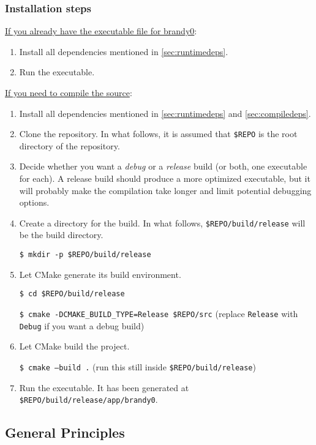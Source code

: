 \documentclass{article}
\newcommand{\icd}[1]{\texttt{#1}}
\newcommand{\ccd}[1]{\colorbox{gray!15!white}{\texttt{#1}}}
\newcommand{\scd}[1]{
	\vspace*{5pt}

	\ccd{#1}
	\vspace*{5pt}
}
\newcommand{\nscd}[1]{\scd{\$ #1}}
\newcommand{\pname}{brandy0}
\begin{document}
\subsubsection{Installation steps}
\underline{If you already have the executable file for \pname{}}:
\begin{enumerate}
	\item
		Install all dependencies mentioned in \ref{sec:runtimedeps}.
	\item
		Run the executable.
\end{enumerate}
\underline{If you need to compile the source}:
\begin{enumerate}
	\item
		Install all dependencies mentioned in \ref{sec:runtimedeps} and \ref{sec:compiledeps}.
	\item
		Clone the repository. In what follows, it is assumed that \icd{\$REPO} is the root directory of the repository.
	\item
		Decide whether you want a \emph{debug} or a \emph{release} build (or both, one executable for each). A release build should produce a more optimized executable, but it will probably make the compilation take longer and limit potential debugging options.
	\item
		Create a directory for the build. In what follows, \icd{\$REPO/build/release} will be the build directory.
		\nscd{mkdir -p \$REPO/build/release}
	\item
		Let CMake generate its build environment.
		\nscd{cd \$REPO/build/release}
		\nscd{cmake -DCMAKE\_BUILD\_TYPE=Release \$REPO/src} (replace \icd{Release} with \icd{Debug} if you want a debug build)
	\item
		Let CMake build the project.
		\nscd{cmake --build .} (run this still inside \icd{\$REPO/build/release})
	\item
		Run the executable. It has been generated at \icd{\$REPO/build/release/app/brandy0}.
\end{enumerate}

\subsection{General Principles}
\end{document}
